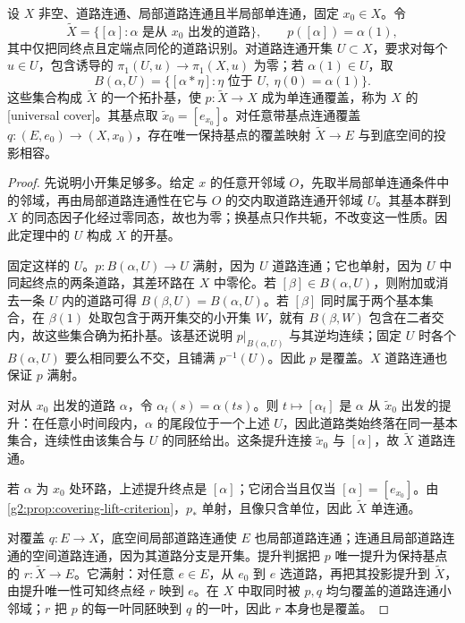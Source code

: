 \begin{theorem}[道路类万有覆盖]\label{g2:thm:universal-cover}
	设 \(X\) 非空、道路连通、局部道路连通且半局部单连通，固定 \(x_0\in X\)。令
	\[
		\widetilde X=\{[\alpha]:\alpha\text{ 是从 }x_0\text{ 出发的道路}\},\qquad
		p([\alpha])=\alpha(1),
	\]
	其中仅把同终点且定端点同伦的道路识别。对道路连通开集 \(U\subset X\)，要求对每个 \(u\in U\)，包含诱导的 \(\pi_1(U,u)\rightarrow\pi_1(X,u)\) 为零；若 \(\alpha(1)\in U\)，取
	\[
		B(\alpha,U)=\{[\alpha*\eta]:\eta\text{ 位于 }U,\ \eta(0)=\alpha(1)\}.
	\]
	这些集合构成 \(\widetilde X\) 的一个拓扑基，使 \(p:\widetilde X\rightarrow X\) 成为单连通覆盖，称为 \(X\) 的[universal cover]。其基点取 \(\widetilde x_0=[e_{x_0}]\)。对任意带基点连通覆盖 \(q:(E,e_0)\rightarrow(X,x_0)\)，存在唯一保持基点的覆盖映射 \(\widetilde X\rightarrow E\) 与到底空间的投影相容。
\end{theorem}
\begin{proof}
	先说明小开集足够多。给定 \(x\) 的任意开邻域 \(O\)，先取半局部单连通条件中的邻域，再由局部道路连通性在它与 \(O\) 的交内取道路连通开邻域 \(U\)。其基本群到 \(X\) 的同态因子化经过零同态，故也为零；换基点只作共轭，不改变这一性质。因此定理中的 \(U\) 构成 \(X\) 的开基。

	固定这样的 \(U\)。\(p:B(\alpha,U)\rightarrow U\) 满射，因为 \(U\) 道路连通；它也单射，因为 \(U\) 中同起终点的两条道路，其差环路在 \(X\) 中零伦。若 \([\beta]\in B(\alpha,U)\)，则附加或消去一条 \(U\) 内的道路可得 \(B(\beta,U)=B(\alpha,U)\)。若 \([\beta]\) 同时属于两个基本集合，在 \(\beta(1)\) 处取包含于两开集交的小开集 \(W\)，就有 \(B(\beta,W)\) 包含在二者交内，故这些集合确为拓扑基。该基还说明 \(p|_{B(\alpha,U)}\) 与其逆均连续；固定 \(U\) 时各个 \(B(\alpha,U)\) 要么相同要么不交，且铺满 \(p^{-1}(U)\)。因此 \(p\) 是覆盖。\(X\) 道路连通也保证 \(p\) 满射。

	对从 \(x_0\) 出发的道路 \(\alpha\)，令 \(\alpha_t(s)=\alpha(ts)\)。则 \(t\mapsto[\alpha_t]\) 是 \(\alpha\) 从 \(\widetilde x_0\) 出发的提升：在任意小时间段内，\(\alpha\) 的尾段位于一个上述 \(U\)，因此道路类始终落在同一基本集合，连续性由该集合与 \(U\) 的同胚给出。这条提升连接 \(\widetilde x_0\) 与 \([\alpha]\)，故 \(\widetilde X\) 道路连通。

	若 \(\alpha\) 为 \(x_0\) 处环路，上述提升终点是 \([\alpha]\)；它闭合当且仅当 \([\alpha]=[e_{x_0}]\)。由\cref{g2:prop:covering-lift-criterion}，\(p_*\) 单射，且像只含单位，因此 \(\widetilde X\) 单连通。

	对覆盖 \(q:E\rightarrow X\)，底空间局部道路连通使 \(E\) 也局部道路连通；连通且局部道路连通的空间道路连通，因为其道路分支是开集。提升判据把 \(p\) 唯一提升为保持基点的 \(r:\widetilde X\rightarrow E\)。它满射：对任意 \(e\in E\)，从 \(e_0\) 到 \(e\) 选道路，再把其投影提升到 \(\widetilde X\)，由提升唯一性可知终点经 \(r\) 映到 \(e\)。在 \(X\) 中取同时被 \(p,q\) 均匀覆盖的道路连通小邻域；\(r\) 把 \(p\) 的每一叶同胚映到 \(q\) 的一叶，因此 \(r\) 本身也是覆盖。
\end{proof}

